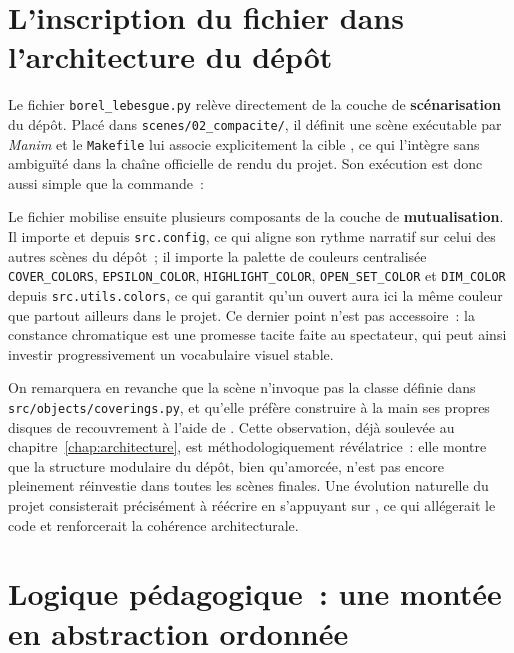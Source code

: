 \documentclass[12pt, a4paper, openany]{report}
\begin{document}
	\section{L’inscription du fichier dans l’architecture du dépôt}

	Le fichier \texttt{borel\_lebesgue.py} relève directement de la couche de \textbf{scénarisation} du dépôt. Placé dans \texttt{scenes/02\_compacite/}, il définit une scène exécutable par \textit{Manim} et le \texttt{Makefile} lui associe explicitement la cible , ce qui l’intègre sans ambiguïté dans la chaîne officielle de rendu du projet. Son exécution est donc aussi simple que la commande~:


	Le fichier mobilise ensuite plusieurs composants de la couche de \textbf{mutualisation}. Il importe  et  depuis \texttt{src.config}, ce qui aligne son rythme narratif sur celui des autres scènes du dépôt~; il importe la palette de couleurs centralisée \texttt{COVER\_COLORS}, \texttt{EPSILON\_COLOR}, \texttt{HIGHLIGHT\_COLOR}, \texttt{OPEN\_SET\_COLOR} et \texttt{DIM\_COLOR} depuis \texttt{src.utils.colors}, ce qui garantit qu’un ouvert aura ici la même couleur que partout ailleurs dans le projet. Ce dernier point n’est pas accessoire~: la constance chromatique est une promesse tacite faite au spectateur, qui peut ainsi investir progressivement un vocabulaire visuel stable.

	On remarquera en revanche que la scène n’invoque pas la classe  définie dans \texttt{src/objects/coverings.py}, et qu’elle préfère construire à la main ses propres disques de recouvrement à l’aide de . Cette observation, déjà soulevée au chapitre~\ref{chap:architecture}, est méthodologiquement révélatrice~: elle montre que la structure modulaire du dépôt, bien qu’amorcée, n’est pas encore pleinement réinvestie dans toutes les scènes finales. Une évolution naturelle du projet consisterait précisément à réécrire  en s’appuyant sur , ce qui allégerait le code et renforcerait la cohérence architecturale.

	\section{Logique pédagogique~: une montée en abstraction ordonnée}
\end{document}
